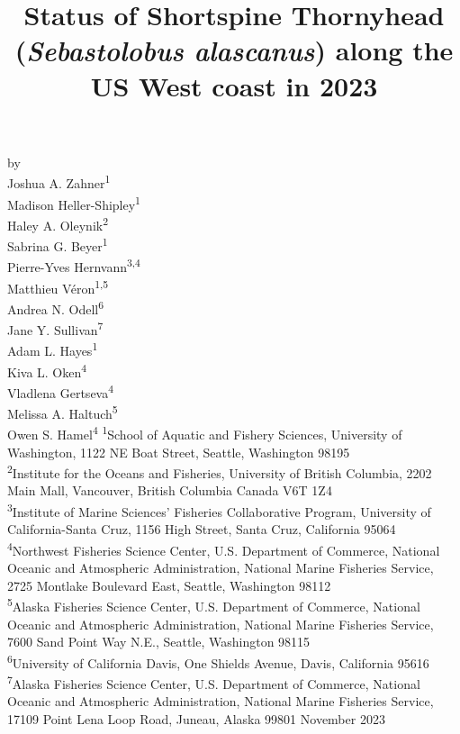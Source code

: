 \documentclass[11pt,
  letterpaper,
]{article}
\date{}
\newcommand{\trTitle}{Status of Shortspine Thornyhead (\emph{Sebastolobus alascanus}) along the US West coast in 2023}
\newcommand{\trYear}{2023}
\newcommand{\trMonth}{November}
\newcommand\includegraphicsifexists[2][width=\linewidth]{\IfFileExists{#2}{\texttt{[image: \#2]}}{}}
\begin{document}

\renewcommand*{\thefootnote}{\fnsymbol{footnote}}

\small
\thispagestyle{empty}
\noindent
\begin{center}
\title{Status of Shortspine Thornyhead (\emph{Sebastolobus alascanus}) along the US West coast in 2023}
\vspace{1.5cm}
{\Large\textbf{}}

\includegraphicsifexists[width=4in]{figure_title.png}
\vfill
by\\
Joshua A. Zahner\textsuperscript{1}\\
Madison Heller-Shipley\textsuperscript{1}\\
Haley A. Oleynik\textsuperscript{2}\\
Sabrina G. Beyer\textsuperscript{1}\\
Pierre-Yves Hernvann\textsuperscript{3,4}\\
Matthieu Véron\textsuperscript{1,5}\\
Andrea N. Odell\textsuperscript{6}\\
Jane Y. Sullivan\textsuperscript{7}\\
Adam L. Hayes\textsuperscript{1}\\
Kiva L. Oken\textsuperscript{4}\\
Vladlena Gertseva\textsuperscript{4}\\
Melissa A. Haltuch\textsuperscript{5}\\
Owen S. Hamel\textsuperscript{4}\vfill
\textsuperscript{1}School of Aquatic and Fishery Sciences, University of Washington, 1122 NE Boat Street, Seattle, Washington 98195\\
\textsuperscript{2}Institute for the Oceans and Fisheries, University of British Columbia, 2202 Main Mall, Vancouver, British Columbia Canada V6T 1Z4\\
\textsuperscript{3}Institute of Marine Sciences' Fisheries Collaborative Program, University of California-Santa Cruz, 1156 High Street, Santa Cruz, California 95064\\
\textsuperscript{4}Northwest Fisheries Science Center, U.S. Department of Commerce, National Oceanic and Atmospheric Administration, National Marine Fisheries Service, 2725 Montlake Boulevard East, Seattle, Washington 98112\\
\textsuperscript{5}Alaska Fisheries Science Center, U.S. Department of Commerce, National Oceanic and Atmospheric Administration, National Marine Fisheries Service, 7600 Sand Point Way N.E., Seattle, Washington 98115\\
\textsuperscript{6}University of California Davis, One Shields Avenue, Davis, California 95616\\
\textsuperscript{7}Alaska Fisheries Science Center, U.S. Department of Commerce, National Oceanic and Atmospheric Administration, National Marine Fisheries Service, 17109 Point Lena Loop Road, Juneau, Alaska 99801\vfill
\trMonth{} \trYear{}
\end{center}
\clearpage
\end{document}
